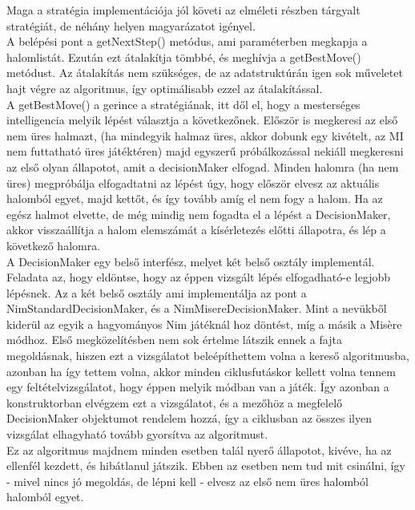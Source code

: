Maga a stratégia implementációja jól követi az elméleti részben tárgyalt stratégiát, de néhány helyen magyarázatot igényel. \\
A belépési pont a getNextStep() metódus, ami paraméterben megkapja a halomlistát. Ezután ezt átalakítja tömbbé, és meghívja a getBestMove() metódust. Az átalakítás nem szükséges, de az adatstruktúrán igen sok műveletet hajt végre az algoritmus, így optimálisabb ezzel az átalakítással.\\
A getBestMove() a gerince a stratégiának, itt dől el, hogy a mesterséges intelligencia melyik lépést választja a következőnek. Először is megkeresi az első nem üres halmazt, (ha mindegyik halmaz üres, akkor dobunk egy kivételt, az MI nem futtatható üres játéktéren) majd egyszerű próbálkozással nekiáll megkeresni az első olyan állapotot, amit a decisionMaker elfogad. Minden halomra (ha nem üres) megpróbálja elfogadtatni az lépést úgy, hogy először elvesz az aktuális halomból egyet, majd kettőt, és így tovább amíg el nem fogy a halom. Ha az egész halmot elvette, de még mindig nem fogadta el a lépést a DecisionMaker, akkor visszaállítja a halom elemszámát a kísérletezés előtti állapotra, és lép a következő halomra.\\
A DecisionMaker egy belső interfész, melyet két belső osztály implementál. Feladata az, hogy eldöntse, hogy az éppen vizsgált lépés elfogadható-e legjobb lépésnek. Az a két belső osztály ami implementálja az pont a NimStandardDecisionMaker, és a NimMisereDecisionMaker. Mint a nevükből kiderül az egyik a hagyományos Nim játéknál hoz döntést, míg a másik a Misère módhoz. Első megközelítésben nem sok értelme látszik ennek a fajta megoldásnak, hiszen ezt a vizsgálatot beleépíthettem volna a kereső algoritmusba, azonban ha így tettem volna, akkor minden ciklusfutáskor kellett volna tennem egy feltételvizsgálatot, hogy éppen melyik módban van a játék. Így azonban a konstruktorban elvégzem ezt a vizsgálatot, és a mezőhöz a megfelelő DecisionMaker objektumot rendelem hozzá, így a ciklusban az összes ilyen vizsgálat elhagyható tovább gyorsítva az algoritmust.\\
Ez az algoritmus majdnem minden esetben talál nyerő állapotot, kivéve, ha az ellenfél kezdett, és hibátlanul játszik. Ebben az esetben nem tud mit csinálni, így - mivel nincs jó megoldás, de lépni kell - elvesz az első nem üres halomból halomból egyet.



